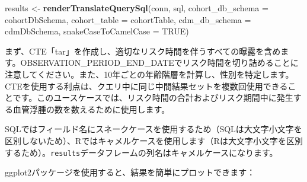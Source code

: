 \documentclass[
  11pt]{book}
\newenvironment{Shaded}{\begin{snugshade}}{\end{snugshade}}
\newcommand{\AttributeTok}[1]{\textcolor[rgb]{0.13,0.29,0.53}{#1}}
\newcommand{\CommentTok}[1]{\textcolor[rgb]{0.56,0.35,0.01}{\textit{#1}}}
\newcommand{\ConstantTok}[1]{\textcolor[rgb]{0.56,0.35,0.01}{#1}}
\newcommand{\DecValTok}[1]{\textcolor[rgb]{0.00,0.00,0.81}{#1}}
\newcommand{\FunctionTok}[1]{\textcolor[rgb]{0.13,0.29,0.53}{\textbf{#1}}}
\newcommand{\NormalTok}[1]{#1}
\newcommand{\OtherTok}[1]{\textcolor[rgb]{0.56,0.35,0.01}{#1}}
\newcommand{\SpecialCharTok}[1]{\textcolor[rgb]{0.81,0.36,0.00}{\textbf{#1}}}
\newcommand{\StringTok}[1]{\textcolor[rgb]{0.31,0.60,0.02}{#1}}
\theoremstyle{definition}
\theoremstyle{definition}
\theoremstyle{definition}
\theoremstyle{definition}
\theoremstyle{remark}
\begin{document}
\begin{Shaded}
\begin{Highlighting}[]
\NormalTok{results }\OtherTok{\textless{}{-}} \FunctionTok{renderTranslateQuerySql}\NormalTok{(conn, sql,}
                                   \AttributeTok{cohort\_db\_schema =}\NormalTok{ cohortDbSchema,}
                                   \AttributeTok{cohort\_table =}\NormalTok{ cohortTable,}
                                   \AttributeTok{cdm\_db\_schema =}\NormalTok{ cdmDbSchema,}
                                   \AttributeTok{snakeCaseToCamelCase =} \ConstantTok{TRUE}\NormalTok{)}
\end{Highlighting}
\end{Shaded}

まず、CTE「tar」を作成し、適切なリスク時間を伴うすべての曝露を含めます。OBSERVATION\_PERIOD\_END\_DATEでリスク時間を切り詰めることに注意してください。また、10年ごとの年齢階層を計算し、性別を特定します。CTEを使用する利点は、クエリ中に同じ中間結果セットを複数回使用できることです。このユースケースでは、リスク時間の合計およびリスク期間中に発生する血管浮腫の数を数えるために使用します。

SQLではフィールド名にスネークケースを使用するため（SQLは大文字小文字を区別しないため）、Rではキャメルケースを使用します（Rは大文字小文字を区別するため）。\texttt{results}データフレームの列名はキャメルケースになります。

ggplot2パッケージを使用すると、結果を簡単にプロットできます：

\begin{Shaded}
\end{Shaded}
\end{document}
